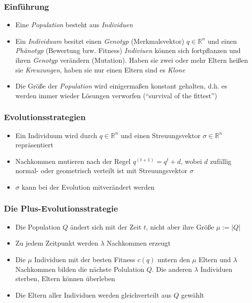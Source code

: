 \subsubsection{Einführung}
\begin{itemize}
	\item Eine \textit{Population} besteht aus \textit{Individuen}
	\item Ein \textit{Individuum} besitzt einen \textit{Genotyp} (Merkmalsvektor) \(q \in \mathbb{R}^n\) und einen \textit{Phänotyp} (Bewertung bzw. Fitness)
	\textit{Indiviuen} können sich fortpflanzen und ihren \textit{Genotyp} verändern (Mutation). Haben sie zwei oder mehr Eltern heißen sie \textit{Kreuzungen}, haben sie nur einen Eltern sind es \textit{Klone}
	\item Die Größe der \textit{Population} wird einigermaßen konstant gehalten, d.h. es werden immer wieder Lösungen verworfen ("`survival of the fittest"')
\end{itemize}

\subsubsection{Evolutionsstrategien}
\begin{itemize}
	\item Ein Individuum wird durch \(q \in \mathbb{R}^n\) und einen Streuungsvektor \(\sigma \in \mathbb{R}^n\) repräsentiert
	\item Nachkommen mutieren nach der Regel \(q^(t+1) = q^t+d\), wobei \(d\) zufällig normal- oder geometrisch verteilt ist mit Streuungsvektor \(\sigma\)
	\item \(\sigma\) kann bei der Evolution mitverändert werden
\end{itemize}

\subsubsection{Die Plus-Evolutionsstrategie}
\begin{itemize}
	\item Die Population \(Q\) ändert sich mit der Zeit \(t\), nicht aber ihre Größe \(\mu := |Q|\)
	\item Zu jedem Zeitpunkt werden \(\lambda\) Nachkommen erzeugt
	\item Die \(\mu\) Individuen mit der besten Fitness \(c(q)\) untern den \(\mu\) Eltern und \(\lambda\) Nachkommen bilden die nächste Polulation \(Q\). Die anderen \(\lambda\) Individuen sterben, Eltern können überleben
	\item Die Eltern aller Individuen werden gleichverteilt aus \(Q\) gewählt 
\end{itemize}

